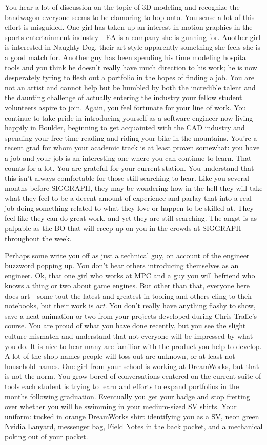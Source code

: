 \documentclass[../main.tex]{subfiles}
\begin{document}
You hear a lot of discussion on the topic of 3D modeling and recognize the bandwagon everyone seems to be clamoring to hop onto. You sense a lot of this effort is misguided. One girl has taken up an interest in motion graphics in the sports entertainment industry---EA is a company she is gunning for. Another girl is interested in Naughty Dog, their art style apparently something she feels she is a good match for. Another guy has been spending his time modeling hospital tools and you think he doesn't really have much direction to his work; he is now desperately tyring to flesh out a portfolio in the hopes of finding a job. You are not an artist and cannot help but be humbled by both the incredible talent and the daunting challenge of actually entering the industry your fellow student volunteers aspire to join. Again, you feel fortunate for your line of work. You continue to take pride in introducing yourself as a software engineer now living happily in Boulder, beginning to get acquainted with the CAD industry and spending your free time reading and riding your bike in the mountains. You're a recent grad for whom your academic track is at least proven somewhat: you have a job and your job is an interesting one where you can continue to learn. That counts for a lot. You are grateful for your current station. You understand that this isn't always comfortable for those still searching to hear. Like you several months before SIGGRAPH, they may be wondering how in the hell they will take what they feel to be a decent amount of experience and parlay that into a real job doing something related to what they love or happen to be skilled at. They feel like they can do great work, and yet they are still searching. The angst is as palpable as the BO that will creep up on you in the crowds at SIGGRAPH throughout the week.

Perhaps some write you off as just a technical guy, on account of the engineer buzzword popping up. You don't hear others introducing themselves as an engineer. Ok, that one girl who works at MPC and a guy you will befriend who knows a thing or two about game engines. But other than that, everyone here does art---some tout the latest and greatest in tooling and others cling to their notebooks, but their work is \textit{art}. You don't really have anything flashy to show, save a neat animation or two from your projects developed during Chris Tralie's course. You are proud of what you have done recently, but you see the slight culture mismatch and understand that not everyone will be impressed by what you do. It is nice to hear many are familiar with the product you help to develop. A lot of the shop names people will toss out are unknown, or at least not household names. One girl from your school is working at DreamWorks, but that is not the norm. You grow bored of conversations centered on the current suite of tools each student is trying to learn and efforts to expand portfolios in the months following graduation. Eventually you get your badge and stop fretting over whether you will be swimming in your medium-sized SV shirts. Your uniform: tucked in orange DreamWorks shirt identifying you as a SV, neon green Nvidia Lanyard, messenger bag, Field Notes in the back pocket, and a mechanical poking out of your pocket.
\end{document}
